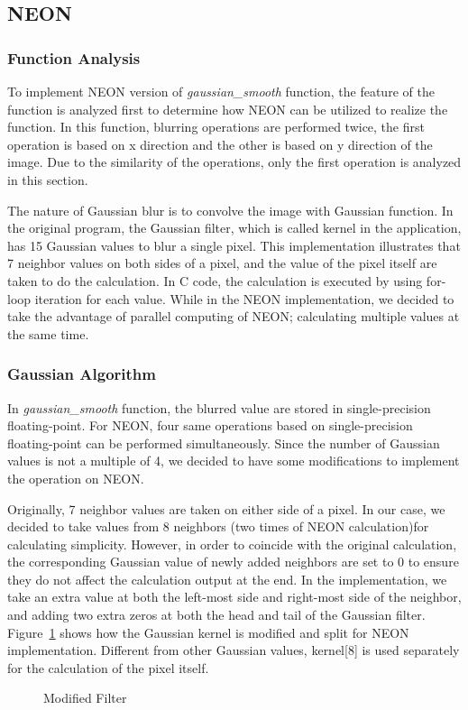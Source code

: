 \subsection{NEON}
\subsubsection{Function Analysis}
To implement NEON version of \textit{gaussian\_smooth} function, the feature of the function is analyzed first to determine how NEON can be utilized to
realize the function. In this function, blurring operations are performed twice, the first operation is based on x direction and the other is based on y direction of the image. Due to the similarity of the operations, only the first operation is analyzed in this section. 

The nature of Gaussian blur is to convolve the image with Gaussian function. In the original program, the Gaussian filter, which is called kernel in the application, has 15 Gaussian values to blur a single pixel. This implementation illustrates that 7 neighbor values on both sides of a pixel, and the value of the pixel itself are taken to do the calculation. In C code, the calculation is executed by using for-loop iteration for each value. While in the NEON implementation, we decided to take the advantage of parallel computing of NEON; calculating multiple values at the same time.

\subsubsection{Gaussian Algorithm}
In \textit{gaussian\_smooth} function, the blurred value are stored in single-precision floating-point. For NEON, four same operations based on single-precision floating-point can be performed simultaneously. Since the number of Gaussian values is not a multiple of 4, we decided to have some modifications to implement the operation on NEON. 

Originally, 7 neighbor values are taken on either side of a pixel. In our case, we decided to take values from 8 neighbors (two times of NEON calculation)for calculating simplicity. However, in order to coincide with the original calculation, the corresponding Gaussian value of newly added neighbors are set to 0 to ensure they do not affect the calculation output at the end. In the implementation, we take an extra value at both the left-most side and right-most side of the neighbor, and adding two extra zeros at both the head and tail of the Gaussian filter. Figure~\ref{fig:newfilter} shows how the Gaussian kernel is modified and split for NEON implementation. Different from other Gaussian values, kernel[8] is used separately for the calculation of the pixel itself. 

\begin{figure}
\centering
\caption{Modified Filter}
\label{fig:newfilter}
\end{figure}
